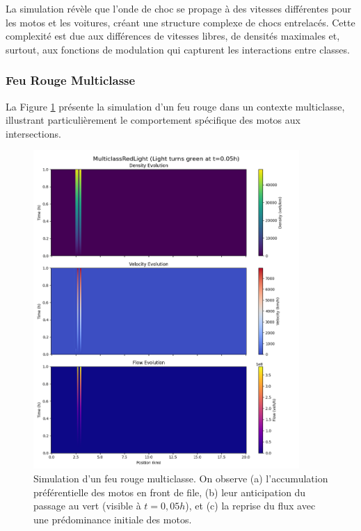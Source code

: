 La simulation révèle que l'onde de choc se propage à des vitesses différentes pour les motos et les voitures, créant une structure complexe de chocs entrelacés. Cette complexité est due aux différences de vitesses libres, de densités maximales et, surtout, aux fonctions de modulation qui capturent les interactions entre classes.

\subsubsection{Feu Rouge Multiclasse}
\label{subsubsec:feu_rouge_multiclasse}

La Figure \ref{fig:feu_rouge_multiclasse} présente la simulation d'un feu rouge dans un contexte multiclasse, illustrant particulièrement le comportement spécifique des motos aux intersections.

\begin{figure}[htbp]
\centering
\includegraphics[width=0.9\textwidth]{simulations/MULTICLASS/redlight/multiclassredlight_(light_turns_green_at_t=0.05h).png}
\caption{Simulation d'un feu rouge multiclasse. On observe (a) l'accumulation préférentielle des motos en front de file, (b) leur anticipation du passage au vert (visible à $t=0,05h$), et (c) la reprise du flux avec une prédominance initiale des motos.}
\label{fig:feu_rouge_multiclasse}
\end{figure}

